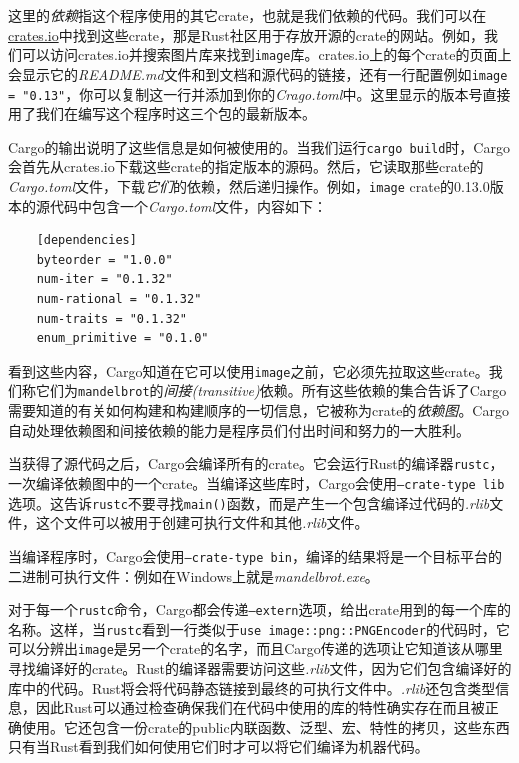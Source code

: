 这里的\emph{依赖}指这个程序使用的其它crate，也就是我们依赖的代码。我们可以在\href{https://crates.io}{crates.io}中找到这些crate，那是Rust社区用于存放开源的crate的网站。例如，我们可以访问crates.io并搜索图片库来找到\texttt{image}库。crates.io上的每个crate的页面上会显示它的\emph{README.md}文件和到文档和源代码的链接，还有一行配置例如\texttt{image = "0.13"}，你可以复制这一行并添加到你的\emph{Crago.toml}中。这里显示的版本号直接用了我们在编写这个程序时这三个包的最新版本。

Cargo的输出说明了这些信息是如何被使用的。当我们运行\texttt{cargo build}时，Cargo会首先从crates.io下载这些crate的指定版本的源码。然后，它读取那些crate的\emph{Cargo.toml}文件，下载\emph{它们}的依赖，然后递归操作。例如，\texttt{image} crate的0.13.0版本的源代码中包含一个\emph{Cargo.toml}文件，内容如下：
\begin{verbatim}
    [dependencies]
    byteorder = "1.0.0"
    num-iter = "0.1.32"
    num-rational = "0.1.32"
    num-traits = "0.1.32"
    enum_primitive = "0.1.0"
\end{verbatim}

看到这些内容，Cargo知道在它可以使用\texttt{image}之前，它必须先拉取这些crate。我们称它们为\texttt{mandelbrot}的\emph{间接(transitive)}依赖。所有这些依赖的集合告诉了Cargo需要知道的有关如何构建和构建顺序的一切信息，它被称为crate的\emph{依赖图}。Cargo自动处理依赖图和间接依赖的能力是程序员们付出时间和努力的一大胜利。

当获得了源代码之后，Cargo会编译所有的crate。它会运行Rust的编译器\texttt{rustc}，一次编译依赖图中的一个crate。当编译这些库时，Cargo会使用\texttt{--crate-type lib}选项。这告诉\texttt{rustc}不要寻找\texttt{main()}函数，而是产生一个包含编译过代码的\emph{.rlib}文件，这个文件可以被用于创建可执行文件和其他\emph{.rlib}文件。

当编译程序时，Cargo会使用\texttt{--crate-type bin}，编译的结果将是一个目标平台的二进制可执行文件：例如在Windows上就是\emph{mandelbrot.exe}。

对于每一个\texttt{rustc}命令，Cargo都会传递\texttt{--extern}选项，给出crate用到的每一个库的名称。这样，当\texttt{rustc}看到一行类似于\texttt{use image::png::PNGEncoder}的代码时，它可以分辨出\texttt{image}是另一个crate的名字，而且Cargo传递的选项让它知道该从哪里寻找编译好的crate。Rust的编译器需要访问这些\emph{.rlib}文件，因为它们包含编译好的库中的代码。Rust将会将代码静态链接到最终的可执行文件中。\emph{.rlib}还包含类型信息，因此Rust可以通过检查确保我们在代码中使用的库的特性确实存在而且被正确使用。它还包含一份crate的public内联函数、泛型、宏、特性的拷贝，这些东西只有当Rust看到我们如何使用它们时才可以将它们编译为机器代码。

